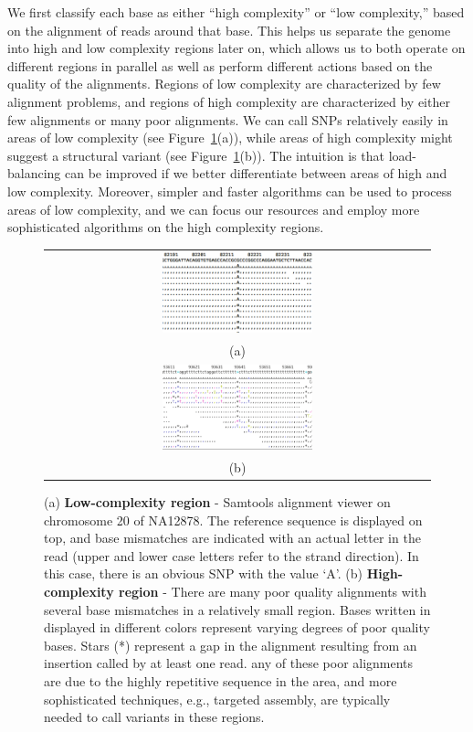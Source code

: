 \documentclass[10pt]{article}
\begin{document}
We first classify each base as either ``high complexity'' or ``low complexity,'' based on the alignment of reads around that base.
This helps us separate the genome into high and low complexity regions later on, which allows us to both operate on different regions in parallel as well as perform different actions based on the quality of the alignments.
Regions of low complexity are characterized by few alignment problems, and regions of high complexity are characterized by either few alignments or many poor alignments.
We can call SNPs relatively easily in
areas of low complexity (see Figure~\ref{low-complexity}(a)), while areas of
high complexity might suggest a structural variant (see
Figure~\ref{low-complexity}(b)).
The intuition is that load-balancing can be improved if we better differentiate between areas of high and low complexity.
Moreover, simpler and faster algorithms can be used to process areas of low complexity, and we can focus our resources and employ more sophisticated algorithms on the high complexity regions.

\begin{figure}[h!]
\begin{center}
\begin{tabular} {@{}c@{}}
  \includegraphics[width=0.40\textwidth]{figs/snp.png} \\ %
   (a) \\
  \includegraphics[width=0.40\textwidth]{figs/high-weirdness.png} \\
   (b) \\
\end{tabular}
\end{center}
\caption{(a) \textbf{Low-complexity region} - Samtools alignment viewer on
chromosome 20 of NA12878.  The reference sequence is displayed on top, and base
mismatches are indicated with an actual letter in the read (upper and lower
case letters refer to the strand direction).  In this case, there is an obvious
SNP with the value `A'. (b) \textbf{High-complexity region} - There are many
poor quality alignments with several base mismatches in a relatively small
region. Bases written in displayed in different colors represent varying degrees of poor quality bases. Stars (*) represent a gap in the alignment resulting from an insertion called by at least one read. any of these poor alignments are due to the highly repetitive
sequence in the area, and more sophisticated techniques, e.g., targeted assembly,
are typically needed to call variants in these regions.  }
  \label{low-complexity}
\end{figure}
\end{document}
